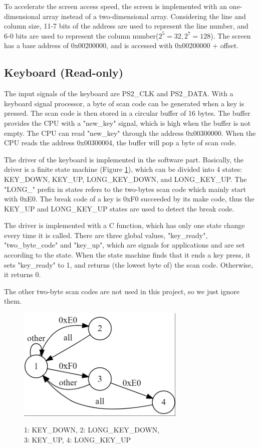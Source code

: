 \documentclass[
	a4paper, %
	11pt, %
]{CSUniSchoolLabReport}
\begin{document}
To accelerate the screen access speed, the screen is implemented with an one-dimensional array instead of a two-dimensional array. Considering the line and column size, 11-7 bits of the address are used to represent the line number, and 6-0 bits are used to represent the column number($2^5=32,2^7=128$). The screen has a base address of 0x00200000, and is accessed with 0x00200000 + offset.
\subsection{Keyboard (Read-only)}
The input signals of the keyboard are PS2\_CLK and PS2\_DATA. With a keyboard signal processor, a byte of scan code can be generated when a key is pressed. The scan code is then stored in a circular buffer of 16 bytes. The buffer provides the CPU with a "new\_key" signal, which is high when the buffer is not empty. The CPU can read "new\_key" through the address 0x00300000. When the CPU reads the address 0x00300004, the buffer will pop a byte of scan code.

The driver of the keyboard is implemented in the software part. Basically, the driver is a finite state machine (Figure \ref{fig:image1}), which can be divided into 4 states: KEY\_DOWN, KEY\_UP, LONG\_KEY\_DOWN, and LONG\_KEY\_UP. The "LONG\_" prefix in states refers to the two-bytes scan code which mainly start with 0xE0. The break code of a key is 0xF0 succeeded by its make code, thus the KEY\_UP and LONG\_KEY\_UP states are used to detect the break code.

The driver is implemented with a C function, which has only one state change every time it is called. There are three global values, "key\_ready", "two\_byte\_code" and "key\_up", which are signals for applications and are set according to the state. When the state machine finds that it ends a key press, it sets "key\_ready" to 1, and returns (the lowest byte of) the scan code. Otherwise, it returns 0.

The other two-byte scan codes are not used in this project, so we just ignore them.

\begin{figure}[!htb]
    \centering
    \includegraphics[width=8cm]{image1.png}
    \par 1: KEY\_DOWN, 2: LONG\_KEY\_DOWN, \\ 3: KEY\_UP, 4: LONG\_KEY\_UP
    \label{fig:image1}

\end{figure}
\end{document}

